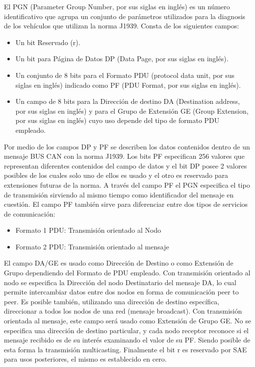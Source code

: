 El PGN (Parameter Group Number, por sus siglas en inglés) es un número identificativo que agrupa un conjunto de parámetros utilizados para la diagnosis de los vehículos que utilizan la norma J1939. Consta de los siguientes campos:
\begin{itemize}
\item Un bit Reservado (r).
\item Un bit para Página de Datos DP (Data Page, por sus siglas en inglés).
\item Un conjunto de 8 bits para el Formato PDU (protocol data unit, por sus siglas en inglés) indicado como PF (PDU Format, por sus siglas en inglés).
\item Un campo de 8 bits para la Dirección de destino DA (Destination address, por sus siglas en inglés) y para el Grupo de Extensión GE (Group Extension, por sus siglas en inglés) cuyo uso depende del tipo de formato PDU empleado.
\end{itemize}
Por medio de los campos DP y PF se describen los datos contenidos dentro de un mensaje BUS CAN con la norma J1939. Los bits PF especifican 256 valores que representan diferentes contenidos del campo de datos y el bit DP posee 2 valores posibles de los cuales solo uno de ellos es usado y el otro es reservado para extensiones futuras de la norma.
A través del campo PF el PGN especifica el tipo de transmisión sirviendo al mismo tiempo como identificador del mensaje en cuestión. El campo PF también sirve para diferenciar entre dos tipos de servicios de comunicación:
\begin{itemize}
\item Formato 1 PDU: Transmisión orientado al Nodo
\item Formato 2 PDU: Transmisión orientado al mensaje
\end{itemize}
El campo DA/GE es usado como Dirección de Destino  o como Extensión de Grupo dependiendo del Formato de PDU  empleado. Con transmisión orientado al nodo se especifica la Dirección del nodo Destinatario del mensaje DA, lo cual permite intercambiar datos entre dos nodos en forma de comunicación peer to peer. Es posible también, utilizando una dirección de destino específica, direccionar a todos los nodos de una red (mensaje broadcast).
Con transmisión orientada al mensaje, este campo será usado como Extensión de Grupo GE. No se especifica una dirección  de destino particular, y cada nodo receptor reconoce si el mensaje recibido es de su interés examinando el valor de su PF. Siendo posible de esta forma la transmisión multicasting.
Finalmente  el bit r es reservado por SAE para usos posteriores, el mismo es establecido en cero.

